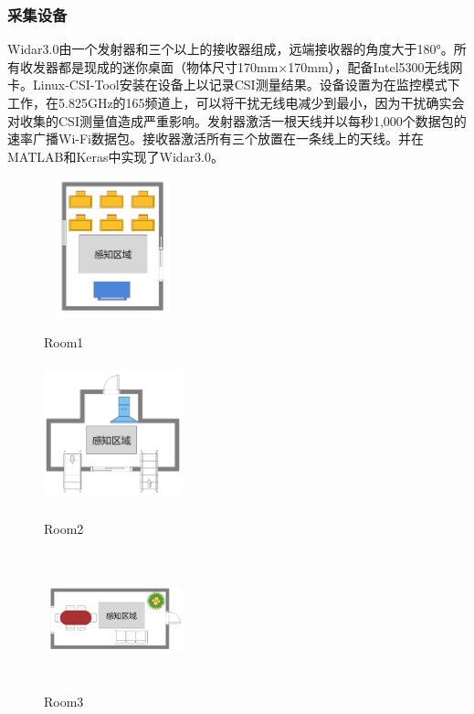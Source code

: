 \documentclass[a4paper]{article}
\begin{document}
  \subsubsection{采集设备}
  Widar3.0由一个发射器和三个以上的接收器组成，远端接收器的角度大于180°。所有收发器都是现成的迷你桌面（物体尺寸170mm×170mm），配备Intel5300无线网卡。Linux-CSI-Tool安装在设备上以记录CSI测量结果。设备设置为在监控模式下工作，在5.825GHz的165频道上，可以将干扰无线电减少到最小，因为干扰确实会对收集的CSI测量值造成严重影响。发射器激活一根天线并以每秒1,000个数据包的速率广播Wi-Fi数据包。接收器激活所有三个放置在一条线上的天线。并在MATLAB和Keras中实现了Widar3.0。 \par
   \begin{figure}[H]
	\centering
	\begin{minipage}{0.3\linewidth}
		\centering
		\includegraphics[width=4cm,height=4cm]{images/Room1.png}
		\caption{Room1}
		\label{fig1}
              \end{minipage}
	\begin{minipage}{0.3\linewidth}
		\centering
		\includegraphics[width=4cm,height=4cm]{images/Room2.png}
		\caption{Room2}
		\label{fig1}
              \end{minipage}
              \begin{minipage}{0.3\linewidth}
                \centering
                \includegraphics[width=4cm,height=4cm]{images/Room3.png}
                \caption{Room3}
                \label{fig1}
              \end{minipage} 
      \end{figure}
\end{document}
